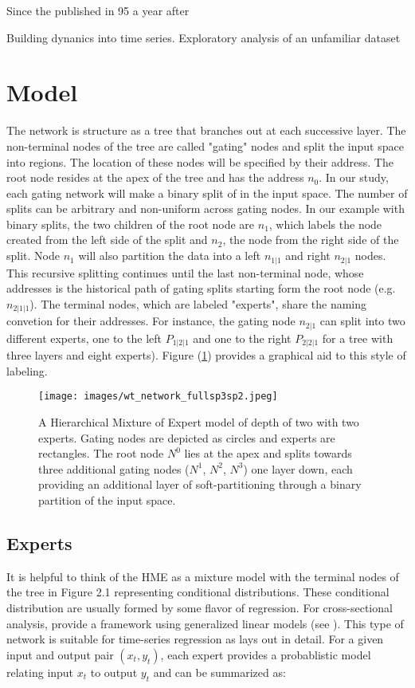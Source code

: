 \documentclass[12pt]{article}
\begin{document}
Since the \cite{WMS} published in 95 a year after \cite{DieboldLeeWeinbach}

Building dynanics into time series. Exploratory analysis of an unfamiliar dataset

\section{Model}

The network is structure as a tree that branches out at each successive layer. The non-terminal nodes of the tree are called "gating" nodes and split the input space into regions. The location of these nodes will be specified by their address. The root node resides at the apex of the tree and has the address $n_{0}$. In our study, each gating network will make a binary split of in the input space. The number of splits can be arbitrary and non-uniform across gating nodes. In our example with binary splits, the two children of the root node are $n_{1}$, which labels the node created from the left side of the split and $n_{2}$, the node from the right side of the split. Node $n_{1}$ will also partition the data into a left $n_{1|1}$ and right $n_{2|1}$ nodes. This recursive splitting continues until the last non-terminal node, whose addresses is the historical path of gating splits starting form the root node (e.g. $n_{2|1|1}$). The terminal nodes, which are labeled "experts", share the naming convetion for their addresses. For instance, the gating node $n_{2|1}$ can split into two different experts, one to the left $P_{1|2|1}$ and one to the right $P_{2|2|1}$ for a tree with three layers and eight experts). Figure (\ref{fig:HMEexample}) provides a graphical aid to this style of labeling.

\begin{figure}[ht]
  \centering
  \texttt{[image: images/wt\_network\_fullsp3sp2.jpeg]}
  \caption{A Hierarchical Mixture of Expert model of depth of two with two experts. Gating nodes are depicted as circles and experts are rectangles. The root node $N^{0}$ lies at the apex and splits towards three additional gating nodes ($N^{1}$, $N^{2}$, $N^{3}$) one layer down, each providing an additional layer of soft-partitioning through a binary partition of the input space.}
  \label{fig:HMEexample}
\end{figure}



\subsection{Experts}
It is helpful to think of the HME as a mixture model with the terminal nodes of the tree in Figure 2.1 representing conditional distributions. These conditional distribution are usually formed by some flavor of regression. For cross-sectional analysis, \cite{JordanJacobsHME} provide a framework using generalized linear models (see \cite{GLM}). This type of network is suitable for time-series regression as \cite{HertaJiangTanner} lays out in detail. For a given input and output pair $(x_{t}, y_{t})$, each expert provides a probablistic model relating input $x_{t}$ to output $y_{t}$ and can be summarized as:
\end{document}
